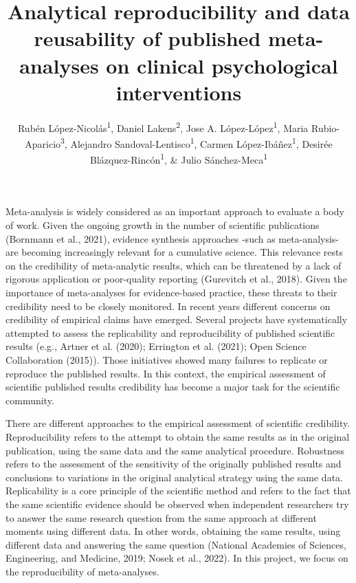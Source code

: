 \documentclass[
  ,jou, a4paper,floatsintext]{apa6}
\title{Analytical reproducibility and data reusability of published meta-analyses on clinical psychological interventions}
\author{Rubén López-Nicolás\textsuperscript{1}, Daniel Lakens\textsuperscript{2}, Jose A. López-López\textsuperscript{1}, Maria Rubio-Aparicio\textsuperscript{3}, Alejandro Sandoval-Lentisco\textsuperscript{1}, Carmen López-Ibáñez\textsuperscript{1}, Desirée Blázquez-Rincón\textsuperscript{1}, \& Julio Sánchez-Meca\textsuperscript{1}}
\date{}
\affiliation{\vspace{0.5cm}\textsuperscript{1} University of Murcia, Spain\\\textsuperscript{2} Eindhoven University of Technology, The Netherlands\\\textsuperscript{3} University of Alicante, Spain}
\begin{document}
\maketitle

Meta-analysis is widely considered as an important approach to evaluate a body of work. Given the ongoing growth in the number of scientific publications (Bornmann et al., 2021), evidence synthesis approaches -such as meta-analysis- are becoming increasingly relevant for a cumulative science. This relevance rests on the credibility of meta-analytic results, which can be threatened by a lack of rigorous application or poor-quality reporting (Gurevitch et al., 2018). Given the importance of meta-analyses for evidence-based practice, these threats to their credibility need to be closely monitored.
In recent years different concerns on credibility of empirical claims have emerged. Several projects have systematically attempted to assess the replicability and reproducibility of published scientific results (e.g., Artner et al. (2020); Errington et al. (2021); Open Science Collaboration (2015)). Those initiatives showed many failures to replicate or reproduce the published results. In this context, the empirical assessment of scientific published results credibility has become a major task for the scientific community.

There are different approaches to the empirical assessment of scientific credibility. Reproducibility refers to the attempt to obtain the same results as in the original publication, using the same data and the same analytical procedure. Robustness refers to the assessment of the sensitivity of the originally published results and conclusions to variations in the original analytical strategy using the same data. Replicability is a core principle of the scientific method and refers to the fact that the same scientific evidence should be observed when independent researchers try to answer the same research question from the same approach at different moments using different data. In other words, obtaining the same results, using different data and answering the same question (National Academies of Sciences, Engineering, and Medicine, 2019; Nosek et al., 2022). In this project, we focus on the reproducibility of meta-analyses.
\end{document}
